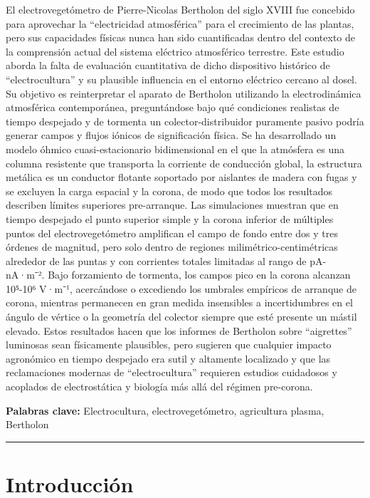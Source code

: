 \documentclass[
]{article}
\begin{document}
El electrovegetómetro de Pierre-Nicolas Bertholon del siglo XVIII fue
concebido para aprovechar la ``electricidad atmosférica'' para el
crecimiento de las plantas, pero sus capacidades físicas nunca han sido
cuantificadas dentro del contexto de la comprensión actual del sistema
eléctrico atmosférico terrestre. Este estudio aborda la falta de
evaluación cuantitativa de dicho dispositivo histórico de
``electrocultura'' y su plausible influencia en el entorno eléctrico
cercano al dosel. Su objetivo es reinterpretar el aparato de Bertholon
utilizando la electrodinámica atmosférica contemporánea, preguntándose
bajo qué condiciones realistas de tiempo despejado y de tormenta un
colector-distribuidor puramente pasivo podría generar campos y flujos
iónicos de significación física. Se ha desarrollado un modelo óhmico
cuasi-estacionario bidimensional en el que la atmósfera es una columna
resistente que transporta la corriente de conducción global, la
estructura metálica es un conductor flotante soportado por aislantes de
madera con fugas y se excluyen la carga espacial y la corona, de modo
que todos los resultados describen límites superiores pre-arranque. Las
simulaciones muestran que en tiempo despejado el punto superior simple y
la corona inferior de múltiples puntos del electrovegetómetro amplifican
el campo de fondo entre dos y tres órdenes de magnitud, pero solo dentro
de regiones milimétrico-centimétricas alrededor de las puntas y con
corrientes totales limitadas al rango de pA-nA·m⁻². Bajo forzamiento de
tormenta, los campos pico en la corona alcanzan 10⁵-10⁶ V·m⁻¹,
acercándose o excediendo los umbrales empíricos de arranque de corona,
mientras permanecen en gran medida insensibles a incertidumbres en el
ángulo de vértice o la geometría del colector siempre que esté presente
un mástil elevado. Estos resultados hacen que los informes de Bertholon
sobre ``aigrettes'' luminosas sean físicamente plausibles, pero sugieren
que cualquier impacto agronómico en tiempo despejado era sutil y
altamente localizado y que las reclamaciones modernas de
``electrocultura'' requieren estudios cuidadosos y acoplados de
electrostática y biología más allá del régimen pre-corona.

\textbf{Palabras clave:} Electrocultura, electrovegetómetro, agricultura
plasma, Bertholon

\begin{center}\rule{0.5\linewidth}{0.5pt}\end{center}

\section{Introducción}\label{introducciuxf3n}
\end{document}
